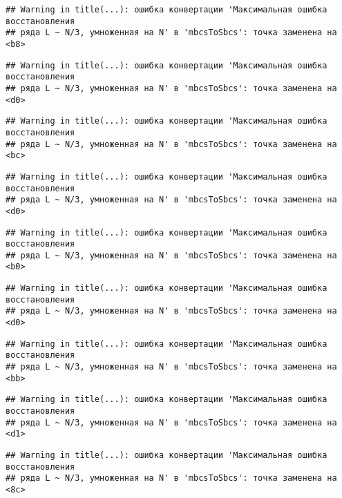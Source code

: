 \documentclass[
]{article}
\begin{document}
\begin{verbatim}
## Warning in title(...): ошибка конвертации 'Максимальная ошибка восстановления
## ряда L ~ N/3, умноженная на N' в 'mbcsToSbcs': точка заменена на <b8>
\end{verbatim}

\begin{verbatim}
## Warning in title(...): ошибка конвертации 'Максимальная ошибка восстановления
## ряда L ~ N/3, умноженная на N' в 'mbcsToSbcs': точка заменена на <d0>
\end{verbatim}

\begin{verbatim}
## Warning in title(...): ошибка конвертации 'Максимальная ошибка восстановления
## ряда L ~ N/3, умноженная на N' в 'mbcsToSbcs': точка заменена на <bc>
\end{verbatim}

\begin{verbatim}
## Warning in title(...): ошибка конвертации 'Максимальная ошибка восстановления
## ряда L ~ N/3, умноженная на N' в 'mbcsToSbcs': точка заменена на <d0>
\end{verbatim}

\begin{verbatim}
## Warning in title(...): ошибка конвертации 'Максимальная ошибка восстановления
## ряда L ~ N/3, умноженная на N' в 'mbcsToSbcs': точка заменена на <b0>
\end{verbatim}

\begin{verbatim}
## Warning in title(...): ошибка конвертации 'Максимальная ошибка восстановления
## ряда L ~ N/3, умноженная на N' в 'mbcsToSbcs': точка заменена на <d0>
\end{verbatim}

\begin{verbatim}
## Warning in title(...): ошибка конвертации 'Максимальная ошибка восстановления
## ряда L ~ N/3, умноженная на N' в 'mbcsToSbcs': точка заменена на <bb>
\end{verbatim}

\begin{verbatim}
## Warning in title(...): ошибка конвертации 'Максимальная ошибка восстановления
## ряда L ~ N/3, умноженная на N' в 'mbcsToSbcs': точка заменена на <d1>
\end{verbatim}

\begin{verbatim}
## Warning in title(...): ошибка конвертации 'Максимальная ошибка восстановления
## ряда L ~ N/3, умноженная на N' в 'mbcsToSbcs': точка заменена на <8c>
\end{verbatim}
\end{document}
